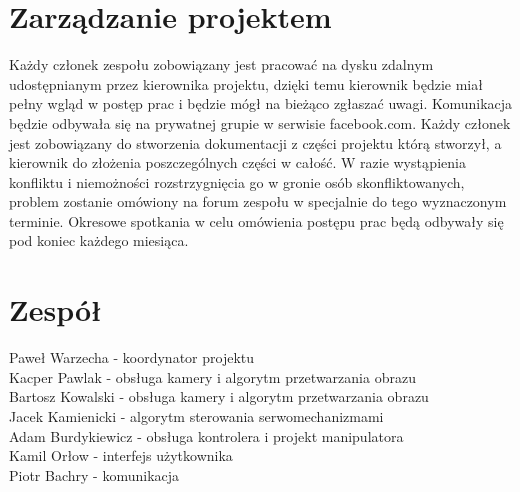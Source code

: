\documentclass[10pt, a4paper]{article}%
\begin{document}
\section{Zarządzanie projektem}
\hspace{15pt}Każdy członek zespołu zobowiązany jest pracować na dysku zdalnym udostępnianym przez kierownika projektu, dzięki temu kierownik będzie miał pełny wgląd w postęp prac i będzie mógł na bieżąco zgłaszać uwagi. Komunikacja będzie odbywała się na prywatnej grupie w serwisie facebook.com. Każdy członek jest zobowiązany do stworzenia dokumentacji z części projektu którą stworzył, a kierownik do złożenia poszczególnych części w całość. W razie wystąpienia konfliktu i niemożności rozstrzygnięcia go w gronie osób skonfliktowanych, problem zostanie omówiony na forum zespołu w specjalnie do tego wyznaczonym terminie. Okresowe spotkania w celu omówienia postępu prac będą odbywały się pod koniec każdego miesiąca.
\section{Zespół}

Paweł Warzecha - koordynator projektu\\
Kacper Pawlak - obsługa kamery i algorytm przetwarzania obrazu\\
Bartosz Kowalski - obsługa kamery i algorytm przetwarzania obrazu\\
Jacek Kamienicki - algorytm sterowania serwomechanizmami\\
Adam Burdykiewicz - obsługa kontrolera i projekt manipulatora\\
Kamil Orłow - interfejs użytkownika\\
Piotr Bachry - komunikacja\\
\end{document}
